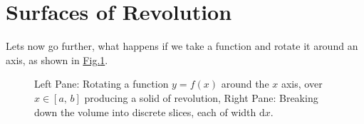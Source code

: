 \documentclass[letterpaper,10pt,english]{jupyterBook}
\begin{document}
\section{Surfaces of Revolution}
\label{\detokenize{VectorCalculus/integrationprelim:surfaces-of-revolution}}
\sphinxAtStartPar
Lets now go further, what happens if we take a function and rotate it around an axis, as shown in \hyperref[\detokenize{VectorCalculus/integrationprelim:areavolumerevolution}]{Fig.\@ \ref{\detokenize{VectorCalculus/integrationprelim:areavolumerevolution}}}.

\begin{figure}[htbp]
\centering
\capstart

\noindent{}
\caption{Left Pane: Rotating a function \(y = f(x)\) around the \(x\) axis, over  \(x \in [a,\, b]\) producing a solid of revolution,
Right Pane: Breaking down the volume into discrete slices, each of width \(\mathrm{d} x\).}\label{\detokenize{VectorCalculus/integrationprelim:areavolumerevolution}}\end{figure}
\end{document}
